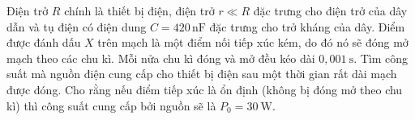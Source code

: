 \begin{vd}
\begin{center}
\begin{tikzpicture}[x=0.75pt,y=0.75pt,yscale=-1,xscale=1]
\end{tikzpicture}
\end{center}
Điện trở $R$ chính là thiết bị điện, điện trở $r \ll R$ đặc trưng cho điện trở của dây dẫn và tụ điện có điện dung $C=420\,\mathrm{nF}$ đặc trưng cho trở kháng của dây. Điểm được đánh dấu $X$ trên mạch là một điểm nối tiếp xúc kém, do đó nó sẽ đóng mở mạch theo các chu kì. Mỗi nửa chu kì đóng và mở đều kéo dài $0,001~\mathrm{s}$. Tìm công suất mà nguồn điện cung cấp cho thiết bị điện sau một thời gian rất dài mạch được đóng. Cho rằng nếu điểm tiếp xúc là ổn định (không bị đóng mở theo chu kì) thì công suất cung cấp bởi nguồn sẽ là $P_0 = 30~\mathrm{W}$.
\end{vd}
